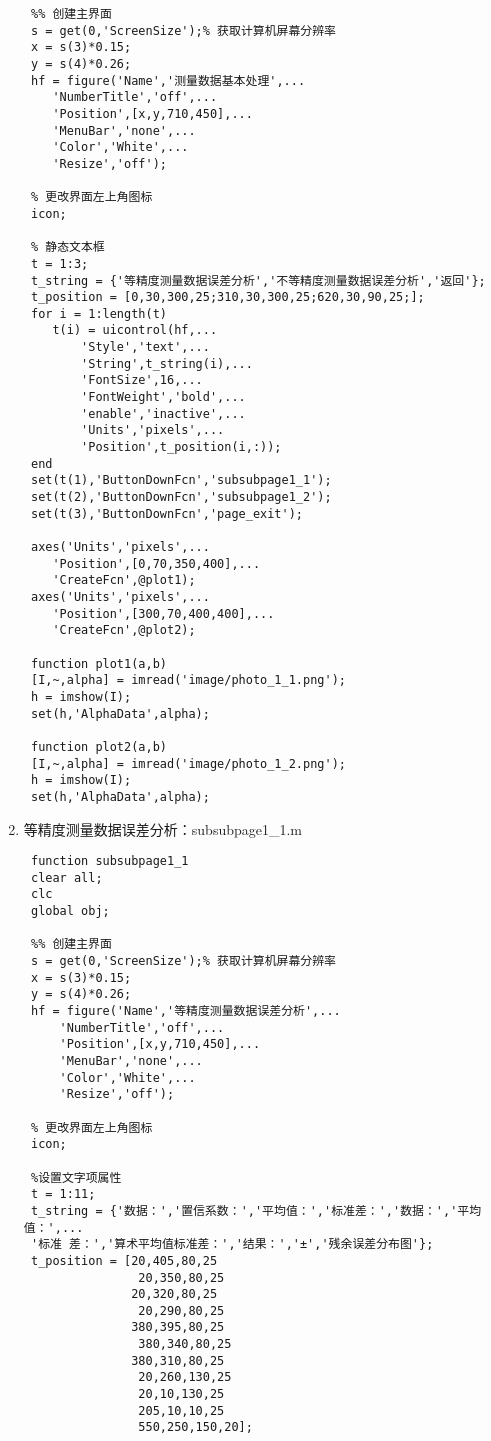 \begin{enumerate}
\begin{lstlisting}
 %% 创建主界面
 s = get(0,'ScreenSize');% 获取计算机屏幕分辨率
 x = s(3)*0.15;
 y = s(4)*0.26;
 hf = figure('Name','测量数据基本处理',...
 	'NumberTitle','off',...
 	'Position',[x,y,710,450],...
 	'MenuBar','none',...
 	'Color','White',...
 	'Resize','off');

 % 更改界面左上角图标
 icon;

 % 静态文本框
 t = 1:3;
 t_string = {'等精度测量数据误差分析','不等精度测量数据误差分析','返回'};
 t_position = [0,30,300,25;310,30,300,25;620,30,90,25;];
 for i = 1:length(t)
 	t(i) = uicontrol(hf,...
 		'Style','text',...
 		'String',t_string(i),...
 		'FontSize',16,...
 		'FontWeight','bold',...
 		'enable','inactive',...
 		'Units','pixels',...
 		'Position',t_position(i,:));
 end
 set(t(1),'ButtonDownFcn','subsubpage1_1');
 set(t(2),'ButtonDownFcn','subsubpage1_2');
 set(t(3),'ButtonDownFcn','page_exit');

 axes('Units','pixels',...
 	'Position',[0,70,350,400],...
 	'CreateFcn',@plot1);
 axes('Units','pixels',...
 	'Position',[300,70,400,400],...
 	'CreateFcn',@plot2);

 function plot1(a,b)
 [I,~,alpha] = imread('image/photo_1_1.png');
 h = imshow(I);
 set(h,'AlphaData',alpha);

 function plot2(a,b)
 [I,~,alpha] = imread('image/photo_1_2.png');
 h = imshow(I);
 set(h,'AlphaData',alpha);\end{lstlisting}
	\item 等精度测量数据误差分析：subsubpage1\_1.m
	\begin{lstlisting}
 function subsubpage1_1
 clear all;
 clc
 global obj;
 
 %% 创建主界面
 s = get(0,'ScreenSize');% 获取计算机屏幕分辨率
 x = s(3)*0.15;
 y = s(4)*0.26;
 hf = figure('Name','等精度测量数据误差分析',...
     'NumberTitle','off',...
     'Position',[x,y,710,450],...
     'MenuBar','none',...
     'Color','White',...
     'Resize','off');
 
 % 更改界面左上角图标
 icon;
 
 %设置文字项属性
 t = 1:11;
 t_string = {'数据：','置信系数：','平均值：','标准差：','数据：','平均值：',...
 '标准 差：','算术平均值标准差：','结果：','±','残余误差分布图'};
 t_position = [20,405,80,25
                20,350,80,25
 			   20,320,80,25
                20,290,80,25
 			   380,395,80,25
                380,340,80,25
 			   380,310,80,25
                20,260,130,25
                20,10,130,25
                205,10,10,25
                550,250,150,20];
 

\end{lstlisting}
\end{enumerate}
